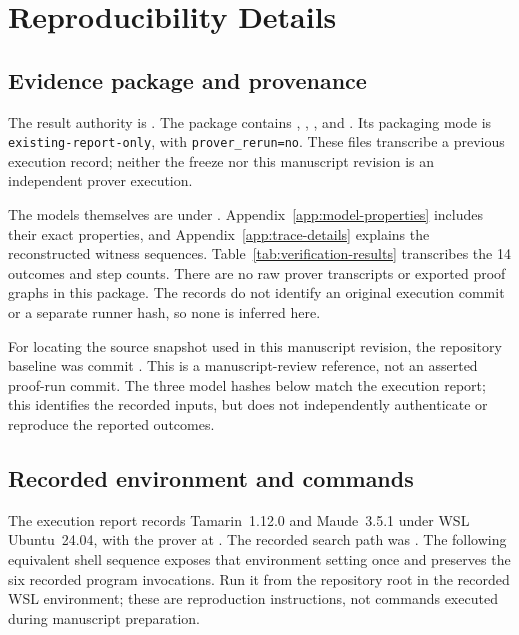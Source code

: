 \section{Reproducibility Details}
\label{app:reproducibility}

\subsection{Evidence package and provenance}
The result authority is
.
The package  contains
, ,
, and . Its packaging mode
is \texttt{existing-report-only}, with \texttt{prover\_rerun=no}.
These files transcribe a previous execution record; neither the freeze nor
this manuscript revision is an independent prover execution.

The models themselves are under . Appendix~\ref{app:model-properties}
includes their exact properties, and Appendix~\ref{app:trace-details} explains
the reconstructed witness sequences. Table~\ref{tab:verification-results}
transcribes the 14 outcomes and step counts. There are no raw prover
transcripts or exported proof graphs in this package. The records do not
identify an original execution commit or a separate runner hash, so none is
inferred here.

For locating the source snapshot used in this manuscript revision, the
repository baseline was commit
.
This is a manuscript-review reference, not an asserted proof-run commit.
The three model hashes below match the execution report; this identifies
the recorded inputs, but does not independently authenticate or reproduce
the reported outcomes.

\subsection{Recorded environment and commands}
The execution report records Tamarin~1.12.0 and Maude~3.5.1 under WSL
Ubuntu~24.04, with the prover at
.
The recorded search path was
.
The following equivalent shell sequence exposes that environment setting
once and preserves the six recorded program invocations. Run it from the
repository root in the recorded WSL environment; these are reproduction
instructions, not commands executed during manuscript preparation.

